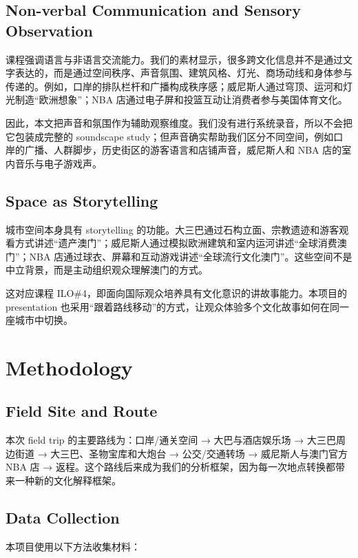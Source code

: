 \documentclass[12pt,a4paper]{article}
\begin{document}
\subsection{Non-verbal Communication and Sensory Observation}

课程强调语言与非语言交流能力。我们的素材显示，很多跨文化信息并不是通过文字表达的，而是通过空间秩序、声音氛围、建筑风格、灯光、商场动线和身体参与传递的。例如，口岸的排队栏杆和广播构成秩序感；威尼斯人通过穹顶、运河和灯光制造“欧洲想象”；NBA 店通过电子屏和投篮互动让消费者参与美国体育文化。

因此，本文把声音和氛围作为辅助观察维度。我们没有进行系统录音，所以不会把它包装成完整的 soundscape study；但声音确实帮助我们区分不同空间，例如口岸的广播、人群脚步，历史街区的游客语言和店铺声音，威尼斯人和 NBA 店的室内音乐与电子游戏声。

\subsection{Space as Storytelling}

城市空间本身具有 storytelling 的功能。大三巴通过石构立面、宗教遗迹和游客观看方式讲述“遗产澳门”；威尼斯人通过模拟欧洲建筑和室内运河讲述“全球消费澳门”；NBA 店通过球衣、屏幕和互动游戏讲述“全球流行文化澳门”。这些空间不是中立背景，而是主动组织观众理解澳门的方式。

这对应课程 ILO\#4，即面向国际观众培养具有文化意识的讲故事能力。本项目的 presentation 也采用“跟着路线移动”的方式，让观众体验多个文化故事如何在同一座城市中切换。

\section{Methodology}

\subsection{Field Site and Route}

本次 field trip 的主要路线为：口岸/通关空间 → 大巴与酒店娱乐场 → 大三巴周边街道 → 大三巴、圣物宝库和大炮台 → 公交/交通转场 → 威尼斯人与澳门官方 NBA 店 → 返程。这个路线后来成为我们的分析框架，因为每一次地点转换都带来一种新的文化解释框架。

\subsection{Data Collection}

本项目使用以下方法收集材料：
\end{document}
